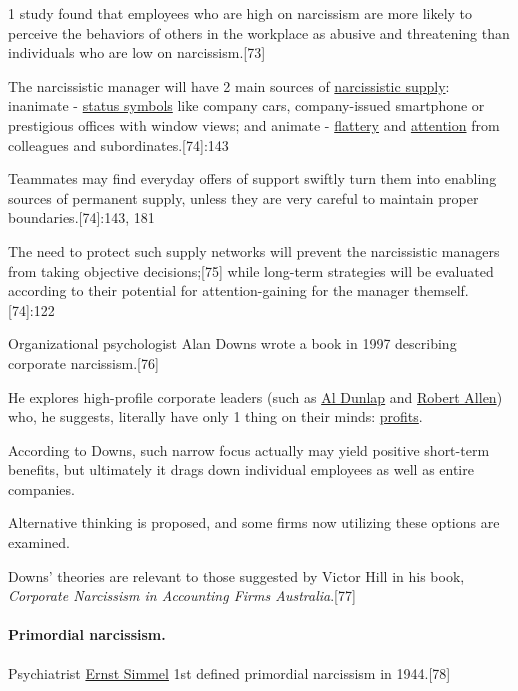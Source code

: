 \documentclass[oneside]{book}
\numberwithin{equation}{section}
\begin{document}

1 study found that employees who are high on narcissism are more likely to perceive the behaviors of others in the workplace as abusive and threatening than individuals who are low on narcissism.[73]

%
The narcissistic manager will have 2 main sources of \href{https://en.wikipedia.org/wiki/Narcissistic_supply}{narcissistic supply}: inanimate - \href{https://en.wikipedia.org/wiki/Status\_symbol}{status symbols} like company cars, company-issued smartphone or prestigious offices with window views; and animate - \href{https://en.wikipedia.org/wiki/Flattery}{flattery} and \href{https://en.wikipedia.org/wiki/Attention}{attention} from colleagues and subordinates.[74]:143

Teammates may find everyday offers of support swiftly turn them into enabling sources of permanent supply, unless they are very careful to maintain proper boundaries.[74]:143, 181

The need to protect such supply networks will prevent the narcissistic managers from taking objective decisions;[75] while long-term strategies will be evaluated according to their potential for attention-gaining for the manager themself.[74]:122

Organizational psychologist Alan Downs wrote a book in 1997 describing corporate narcissism.[76]

He explores high-profile corporate leaders (such as \href{https://en.wikipedia.org/wiki/Al_Dunlap}{Al Dunlap} and \href{https://en.wikipedia.org/wiki/Robert_Eugene_Allen}{Robert Allen}) who, he suggests, literally have only 1 thing on their minds: \href{https://en.wikipedia.org/wiki/Profit_(economics)}{profits}.

According to Downs, such narrow focus actually may yield positive short-term benefits, but ultimately it drags down individual employees as well as entire companies.

Alternative thinking is proposed, and some firms now utilizing these options are examined.

Downs' theories are relevant to those suggested by Victor Hill in his book, \textit{Corporate Narcissism in Accounting Firms Australia}.[77]

\paragraph{Primordial narcissism.} Psychiatrist \href{https://en.wikipedia.org/wiki/Ernst_Simmel}{Ernst Simmel} 1st defined primordial narcissism in 1944.[78]
\end{document}
